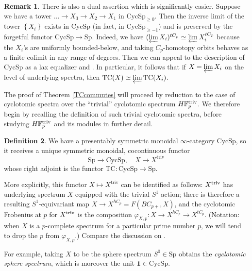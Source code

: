 \documentclass{amsart}
\newcommand{\Sp}{\mathrm{Sp}}
\theoremstyle{definition}
\newtheorem{definition}{Definition}[section]
\newtheorem{remark}[definition]{Remark}
\newcommand{\bb}{\mathbb}
\newcommand{\sub}[1]{{\mbox{\rm \scriptsize #1}}}
\newcommand{\CycSp}{\mathrm{CycSp}}
\newcommand{\TC}{\mathrm{TC}}
\begin{document}
\begin{remark} 
\label{TCinvlim}
There is also a dual assertion which is significantly easier. 
Suppose we have a  tower  $\dots \to X_3 \to
X_2 \to X_1$ in $\CycSp_{\geq 0}$. 
Then the inverse limit of the tower $\left\{X_i\right\}$ exists in $\CycSp$
(in fact, in $\CycSp_{\geq -1}$) and
is preserved by the forgetful functor $\CycSp \to \Sp$. 
Indeed, we have $(\varprojlim X_i)^{tC_p} \simeq \varprojlim X_i^{tC_p}$ because
the $X_i$'s are uniformly bounded-below, and taking $C_p$-homotopy orbits
behaves as a finite colimit in any range of degrees. 
Then we can appeal to the description of $\CycSp$ as a lax equalizer and
\cite[Prop. II.1.5]{nikolaus-scholze}. 
In particular, it follows that if $X = \varprojlim X_i$ on the level of underlying spectra, then $\TC(X) \simeq
\varprojlim \TC(X_i)$. 
\end{remark} 

The proof of Theorem \ref{TCcommutes} will proceed by reduction to the case of
cyclotomic spectra over the ``trivial'' cyclotomic spectrum $ H\bb
 F_p^\sub{triv}$. We therefore begin by recalling the definition of such
 trivial cyclotomic spectra, before studying $H \bb F_p^\sub{triv}$ and its modules in further detail.

\begin{definition}\label{cons_trivial}
We have a presentably symmetric monoidal $\infty$-category $\CycSp$, so it receives a unique symmetric monoidal,
cocontinuous functor
\[  \Sp \to \CycSp,\quad X \mapsto X^{\mathrm{triv}}  \]
whose right adjoint is the functor $\TC: \CycSp \to \Sp$.

More explicitly, this functor $X \mapsto X^{\mathrm{triv}}$ can be identified as follows: $X^\sub{triv}$ has underlying spectrum $X$ equipped with the
trivial $S^1$-action; there is therefore a resulting $S^1$-equivariant map $X \to X^{hC_p} =
F(BC_{p+}, X)$, and the cyclotomic Frobenius at $p$ for $X^\sub{triv}$ is the
composition $\varphi_{X,p}:X\to X^{hC_p} \to X^{tC_p}$. (Notation: when $X$ is a
$p$-complete spectrum for a particular prime number $p$, we will tend to drop
the $p$ from $\varphi_{X,p}$.) Compare the discussion on \cite[p.
126]{nikolaus-scholze}. 

For example, taking $X$ to be the sphere spectrum $S^0 \in
\Sp$ obtains the {\em cyclotomic sphere spectrum}, which is moreover the unit $\mathbf{1} \in \CycSp$.
\end{definition}
\end{document}

